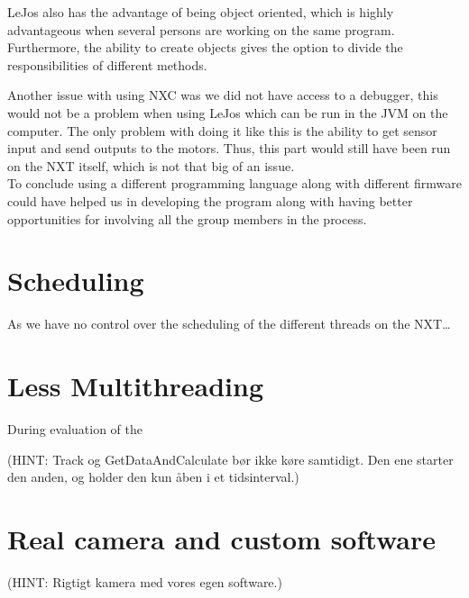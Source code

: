 LeJos also has the advantage of being object oriented, which is highly
advantageous when several persons are working on the same program. Furthermore,
the ability to create objects gives the option to divide the responsibilities of
different methods.\nl

Another issue with using NXC was we did not have access to a debugger, this
would not be a problem when using LeJos which can be run in the JVM on the
computer. The only problem with doing it like this is the ability to get sensor
input and send outputs to the motors. Thus, this part would still have been run
on the NXT itself, which is not that big of an issue.\\
To conclude using a different programming language along with different firmware
could have helped us in developing the program along with having better
opportunities for involving all the group members in the process.

\section{Scheduling}
As we have no control over the scheduling of the different threads on the NXT\ldots

\section{Less Multithreading}
During evaluation of the 

(HINT: Track og GetDataAndCalculate bør ikke køre samtidigt. Den ene starter
  den anden, og holder den kun åben i et tidsinterval.)

\section{Real camera and custom software}
(HINT: Rigtigt kamera med vores egen software.)
